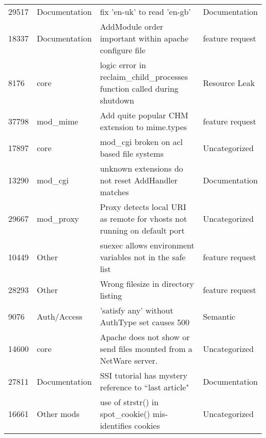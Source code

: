 \begin{longtable}[c]{p{1cm}p{3cm}p{6cm}p{4cm}}
29517  & Documentation      & fix 'en-uk' to read 'en-gb'                                                                                    & Documentation     \\
18337  & Documentation      & AddModule order important within apache configure file                                                         & feature request   \\
8176   & core               & logic error in reclaim\_child\_processes function called during shutdown                                       & Resource Leak     \\
37798  & mod\_mime          & Add quite popular CHM extension to mime.types                                                                  & feature request   \\
17897  & core               & mod\_cgi broken on acl based file systems                                                                      & Uncategorized     \\
13290  & mod\_cgi           & unknown extensions do not reset AddHandler matches                                                             & Documentation     \\
29667  & mod\_proxy         & Proxy detects local URI as remote for vhosts not running on default port                                       & Uncategorized     \\
10449  & Other              & suexec allows environment variables not in the safe list                                                       & feature request   \\
28293  & Other              & Wrong filesize in directory listing                                                                            & feature request   \\
9076   & Auth/Access        & 'satisfy any' without AuthType set causes 500                                                                  & Semantic          \\
14600  & core               & Apache does not show or send files mounted from a NetWare server.                                              & Uncategorized     \\
27811  & Documentation      & SSI tutorial has mystery reference to ``last article"                                                           & Documentation     \\
16661  & Other mods         & use of strstr() in spot\_cookie() mis-identifies cookies                 & Uncategorized     \\

\end{longtable}
